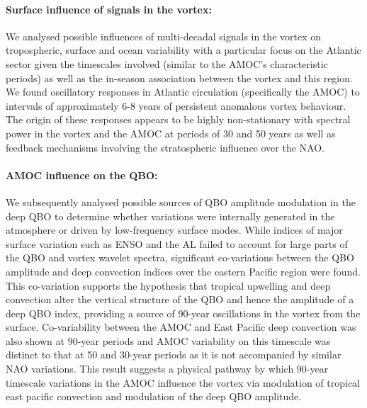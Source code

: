 \paragraph{Surface influence of signals in the vortex:}
We analysed possible influences of multi-decadal signals in the vortex on tropospheric, surface and ocean variability with a particular focus on the Atlantic sector given the timescales involved (similar to the AMOC's characteristic periods) as well as the in-season association between the vortex and this region. We found oscillatory responses in Atlantic circulation (specifically the AMOC) to intervals of approximately 6-8 years of persistent anomalous vortex behaviour. The origin of these responses appears to be highly non-stationary with spectral power in the vortex and the AMOC at periods of 30 and 50 years as well as feedback mechanisms involving the stratospheric influence over the NAO.

\paragraph{AMOC influence on the QBO:}
We subsequently analysed possible sources of QBO amplitude modulation in the deep QBO to determine whether variations were internally generated in the atmosphere or driven by low-frequency surface modes. While indices of major surface variation such as ENSO and the AL failed to account for large parts of the QBO and vortex wavelet spectra, significant co-variations between the QBO amplitude and deep convection indices over the eastern Pacific region were found. This co-variation supports the hypothesis that tropical upwelling and deep convection alter the vertical structure of the QBO and hence the amplitude of a deep QBO index, providing a source of 90-year oscillations in the vortex from the surface. Co-variability between the AMOC and East Pacific deep convection was also shown at 90-year periods and AMOC variability on this timescale was distinct to that at 50 and 30-year periods as it is not accompanied by similar NAO variations. This result suggests a physical pathway by which 90-year timescale variations in the AMOC influence the vortex via modulation of tropical east pacific convection and modulation of the deep QBO amplitude. 

